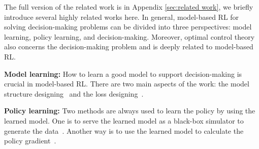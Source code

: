\documentclass{article} %
\newcommand{\yue}[1]{ {#1}}
\begin{document}
The full version of the related work is in Appendix \ref{sec:related work}, we briefly introduce several highly related works here. In general, model-based RL for solving decision-making problems can be divided into three perspectives: model learning, policy learning, and decision-making. Moreover, optimal control theory also concerns the decision-making problem and is deeply related to model-based RL.


\textbf{Model learning:} How to learn a good model to support decision-making is crucial in model-based RL. There are two main aspects of the work: the model structure designing~\citep{chua_deep_2018,zhang_importance_2021,zhang2020autoregressive,hafner2021mastering,chen2022transdreamer} and the loss designing~\citep{doro_gradient-aware_2020,farahmand_value-aware_2017,li2021gradient}. 

\textbf{Policy learning:} 
Two methods are always used to learn the policy by using the learned model. One is to serve the learned model as a black-box simulator to generate the data~\citep{janner_when_2019,yu2020mopo,lee2020representation}. Another way is to use the learned model to calculate the policy gradient~\citep{heess_learning_2015,clavera_model-augmented_2019,amos_model-based_2021}.
\end{document}

